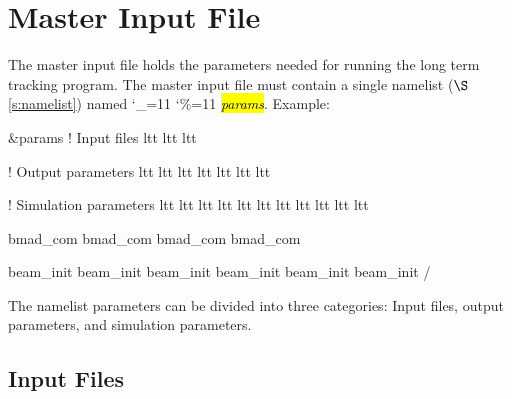 \documentclass{hitec}
\newcommand\dottcmd[1]{\hl{\em#1}\endgroup}
\newcommand{\vn}{\begingroup\catcode`\_=11 \catcode`\%=11 \dottcmd}
\newcommand{\sref}[1]{$\S$\ref{#1}}
\newcommand{\Section}[1]{\section{#1}\vspace*{-1ex}}
\begin{document}
{{{{{{{{{{{{{{{\newpage

\Section{Master Input File}
\label{s:input}

The master input file holds the parameters needed for running the long term tracking program. The
master input file must contain a single namelist (\sref{s:namelist}) named \vn{params}.  Example:
\begin{code}
&params
  ! Input files
  ltt%
  ltt%
  ltt%

  ! Output parameters
  ltt%
  ltt%
  ltt%
  ltt%
  ltt%
  ltt%
  ltt%

  ! Simulation parameters
  ltt%
  ltt%
  ltt%
  ltt%
  ltt%
  ltt%
  ltt%
  ltt%
  ltt%
  ltt%
  ltt%

  bmad_com%
  bmad_com%
  bmad_com%
  bmad_com%

  beam_init%
  beam_init%
  beam_init%
  beam_init%
  beam_init%
  beam_init%
/
\end{code}

\newpage

The namelist parameters can be divided into three categories: Input files, output parameters, and
simulation parameters.

\subsection{Input Files}

}}}}}}}}}}}}}}}
\end{document}
